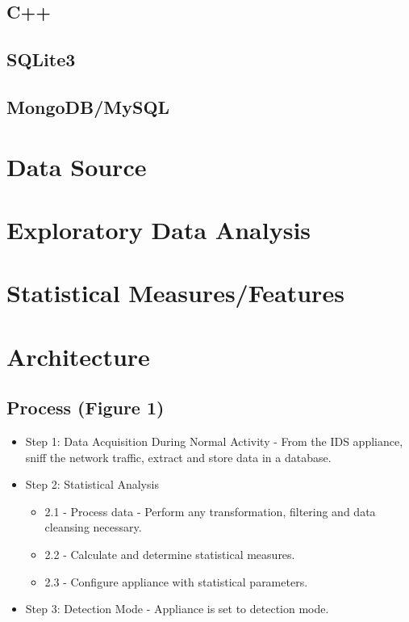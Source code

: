 \documentclass[]{article}
\begin{document}
\subsection{C++}\label{c}

\subsection{SQLite3}\label{sqlite3}

\subsection{MongoDB/MySQL}\label{mongodbmysql}

\section{Data Source}\label{data-source}

\section{Exploratory Data Analysis}\label{exploratory-data-analysis}

\section{Statistical
Measures/Features}\label{statistical-measuresfeatures}

\section{Architecture}\label{architecture}

\subsection{Process (Figure 1)}\label{process-figure-1}

\begin{itemize}
\itemsep1pt\parskip0pt
\item
  Step 1: Data Acquisition During Normal Activity - From the IDS
  appliance, sniff the network traffic, extract and store data in a
  database.
\item
  Step 2: Statistical Analysis

  \begin{itemize}
  \itemsep1pt\parskip0pt
  \item
    2.1 - Process data - Perform any transformation, filtering and data
    cleansing necessary.
  \item
    2.2 - Calculate and determine statistical measures.
  \item
    2.3 - Configure appliance with statistical parameters.
  \end{itemize}
\item
  Step 3: Detection Mode - Appliance is set to detection mode.
\end{itemize}
\end{document}
